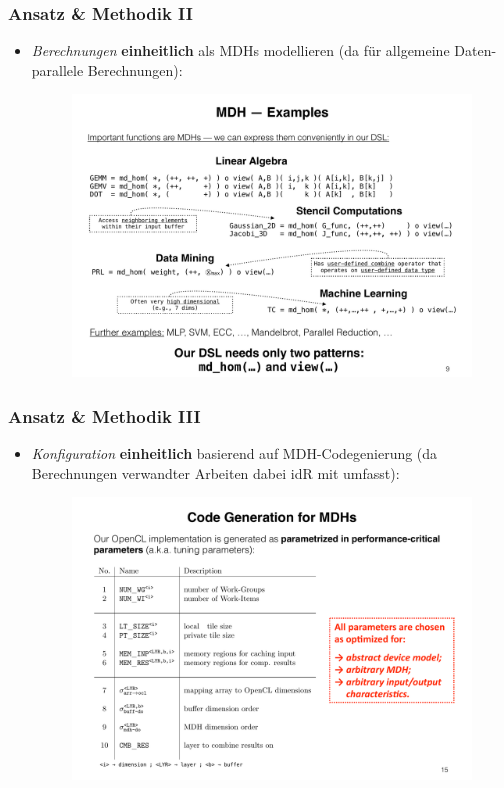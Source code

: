 \documentclass{presentation}
\begin{document}
\begin{frame}
	\frametitle{Ansatz \& Methodik II}
	\begin{itemize}
		\item \emph{Berechnungen} \textbf{einheitlich} als MDHs modellieren (da für allgemeine Daten-parallele Berechnungen):
		\footnotemark[\value{footnote}]
		\begin{figure}
			\includegraphics[width=0.6\linewidth]{images/mdhs.pdf}
		\end{figure}
	\end{itemize}
\end{frame}

\begin{frame}
	\frametitle{Ansatz \& Methodik III}
	\begin{itemize}
		\item \emph{Konfiguration} \textbf{einheitlich} basierend auf MDH-Codegenierung (da Berechnungen verwandter Arbeiten dabei idR mit umfasst):
		\footnotemark[\value{footnote}]
		\begin{figure}
			\includegraphics[width=0.6\linewidth]{images/configs.pdf}
		\end{figure}
		\framebreak
	\end{itemize}
\end{frame}
\end{document}
